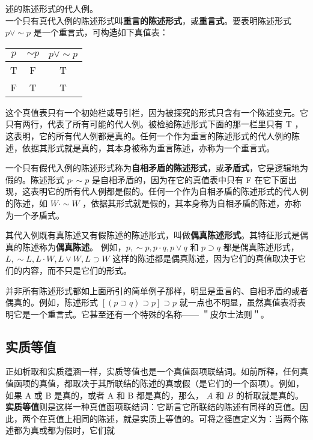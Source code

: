 述的陈述形式的代人例。\\
一个只有真代入例的陈述形式叫\textbf{重言的陈述形式}，或\textbf{重言式}。要表明陈述形式 $p \vee \sim p$ 是一个重言式，可构造如下真值表：

\begin{center}
\begin{tabular}{|ccc|}
\hline
$p$ & $\sim p$ & $p \vee \sim p$ \\
\hline
T & F & T \\
F & T & T \\
\hline
\end{tabular}
\end{center}

这个真值表只有一个初始栏或导引栏，因为被探究的形式只含有一个陈述变元。它只有两行，代表了所有可能的代人例。被检验陈述形式下面的那一栏里只有 T ，这表明，它的所有代人例都是真的。任何一个作为重言的陈述形式的代人例的陈述，依据其形式就是真的，其本身被称为重言陈述，亦称为一个重言式。

一个只有假代入例的陈述形式称为\textbf{自相矛盾的陈述形式}，或\textbf{矛盾式}，它是逻辑地为假的。陈述形式 $p \cdot \sim p$ 是自相矛盾的，因为在它的真值表中只有 F 在它下面出现，这表明它的所有代人例都是假的。任何一个作为自相矛盾的陈述形式的代人例的陈述，如 $W \cdot \sim W$ ，依据其形式就是假的，其本身称为自相矛盾的陈述，亦称为一个矛盾式。

其代入例既有真陈述又有假陈述的陈述形式，叫做\textbf{偶真陈述形式}。其特征形式是偶真的陈述称为\textbf{偶真陈述}。\cite{whitehead1911} 例如，$p, \sim p, p \cdot q, p \vee q$ 和 $p \supset q$ 都是偶真陈述形式，$L, \sim L, L \cdot W, L \vee W, L \supset W$ 这样的陈述都是偶真陈述，因为它们的真值取决于它们的内容，而不只是它们的形式。

并非所有陈述形式都如上面所引的简单例子那样，明显是重言的、自相矛盾的或者偶真的。例如，陈述形式 $[(p \supset q) \supset p] \supset p$ 就一点也不明显，虽然真值表将表明它是一个重言式。它甚至还有一个特殊的名称—— ＂皮尔士法则＂。

\subsection{实质等值}
正如析取和实质蕴涵一样，实质等值也是一个真值函项联结词。如前所释，任何真值函项的真值，都取决于其所联结的陈述的真或假（是它们的一个函项）。例如，如果 A 或 B 是真的，或者 A 和 B 都是真的，那么， $A$ 和 $B$ 的析取就是真的。\textbf{实质等值}则是这样一种真值函项联结词：它断言它所联结的陈述有同样的真值。因此，两个在真值上相同的陈述，就是实质上等值的。可将之径直定义为：当两个陈述都为真或都为假时，它们就

